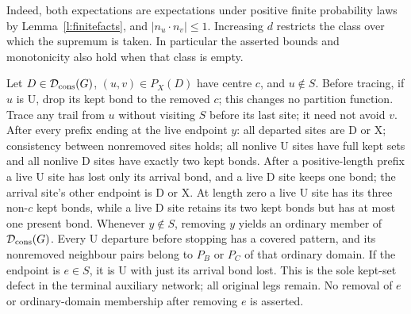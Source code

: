 Indeed, both expectations are expectations under positive finite
probability laws by Lemma~\ref{l:finitefacts}, and
\(|n_u\cdot n_v|\le1\).  Increasing \(d\) restricts the class over
which the supremum is taken.  In particular the asserted bounds and
monotonicity also hold when that class is empty.

\begin{lemma}\label{l:closure}
Let \(D\in\mathcal D_{\rm cons}(G)\), \((u,v)\in P_X(D)\) have
centre \(c\), and \(u\notin S\). Before tracing, if \(u\) is
\(\mathrm U\), drop its kept bond to the removed \(c\); this changes
no partition function. Trace any trail from \(u\) without visiting
\(S\) before its last site; it need not avoid \(v\).
After every prefix ending at the live endpoint \(y\):
all departed sites are \(\mathrm D\) or \(\mathrm X\);
consistency between nonremoved sites holds; all nonlive
\(\mathrm U\) sites have full kept sets and all nonlive \(\mathrm D\)
sites have exactly two kept bonds.
After a positive-length prefix a live \(\mathrm U\) site has lost
only its arrival bond, and a live \(\mathrm D\) site keeps one bond;
the arrival site's other endpoint is \(\mathrm D\) or \(\mathrm X\).
At length zero a live \(\mathrm U\) site has its three non-\(c\)
kept bonds, while a live \(\mathrm D\) site retains its two kept
bonds but has at most one present bond.
Whenever \(y\notin S\), removing \(y\) yields an ordinary member
of \(\mathcal D_{\rm cons}(G)\). Every \(\mathrm U\) departure
before stopping has a covered pattern, and its nonremoved neighbour
pairs belong to \(P_B\) or \(P_C\) of that ordinary domain.
If the endpoint is \(e\in S\), it is \(\mathrm U\) with just its
arrival bond lost. This is the sole kept-set defect in the terminal
auxiliary network; all original legs remain. No removal of \(e\)
or ordinary-domain membership after removing \(e\) is asserted.
\end{lemma}

